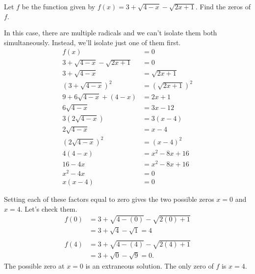 \documentclass[nooutcomes]{ximera}
\begin{document}
		
	\begin{example}

		Let $f$ be the function given by $f(x) = 3 + \sqrt{4-x}-\sqrt{2x+1}$. Find the zeros of $f$.
	
		\begin{explanation}

			In this case, there are multiple radicals and we can't isolate them both simultaneously. Instead, we'll isolate just one of them first.
			\begin{align*}
				f(x) &= 0\\
				3 + \sqrt{4-x}-\sqrt{2x+1} &= 0 \\
				3 + \sqrt{4-x}  &= \sqrt{2x+1} \\
				\left(3+\sqrt{4-x}\right)^2 &= \left( \sqrt{2x+1} \right)^2\\
				9 + 6\sqrt{4-x} + (4-x) &= 2x+1\\
				6\sqrt{4-x} &= 3x -12 \\
				3\left( 2\sqrt{4-x} \right) &= 3(x-4)\\
				2\sqrt{4-x} &= x-4\\
				\left( 2\sqrt{4-x} \right)^2 &= (x-4)^2\\
				4(4-x) &= x^2-8x+16\\
				16-4x &= x^2-8x+16\\
				x^2 -4x &= 0\\
				x(x-4) &= 0
			\end{align*}

			Setting each of these factors equal to zero gives the two possible zeros $x=0$ and $x=4$. Let's check them.
			\begin{align*}
				f(0) & = 3 + \sqrt{4-(0)}-\sqrt{2(0)+1} \\
					& = 3 + \sqrt{4}-\sqrt{1} = 4\\ \\
				f(4) & = 3 + \sqrt{4-(4)}-\sqrt{2(4)+1} \\
					& = 3 + \sqrt{0}-\sqrt{9} = 0.
			\end{align*}			
			The possible zero at $x=0$ is an extraneous solution. The only zero of $f$ is $x=4$.
		\end{explanation}
	\end{example}
	
	
\end{document}
